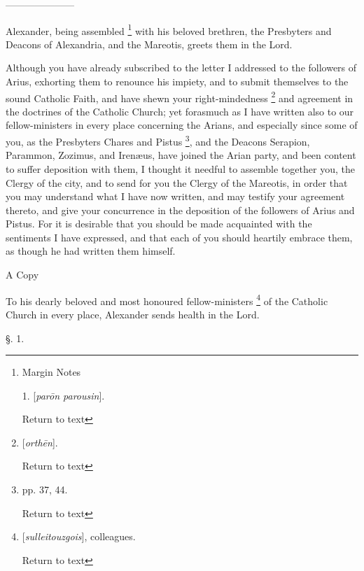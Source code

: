 ———————

Alexander, being assembled \footnote{Margin Notes

1. [\emph{par\={o}n parousin}].

Return to text} with his beloved brethren, the Presbyters and Deacons of
Alexandria, and the Mareotis, greets them in the Lord.

Although you have already subscribed to the
letter I addressed to the followers of Arius, exhorting them to
renounce his impiety, and to submit themselves to the sound Catholic
Faith, and have shewn your right-mindedness \footnote{[\emph{orth\={e}n}].

Return to text} and agreement in the doctrines of the Catholic Church; yet
forasmuch as I have written also to our fellow-ministers in every
place concerning the Arians, and especially since some of you, as the
Presbyters Chares and Pistus \footnote{pp. 37, 44.

Return to text},
and the Deacons Serapion, Parammon, Zozimus, and Irenæus, have
joined the Arian party, and been content to suffer deposition with
them, I thought it needful to assemble together you, the Clergy of the
city, and to send for you the Clergy of the Mareotis, in order that
you may understand what I have now written, and may testify your
agreement thereto, and give your concurrence in the deposition of the
followers of Arius and Pistus. For it is desirable that you should be
made acquainted with the sentiments I have expressed, and that each of
you should heartily embrace them, as though he had written them
himself.

A Copy

To his dearly beloved and most honoured
fellow-ministers \footnote{[\emph{sulleitouzgois}],
colleagues.

Return to text} of the
Catholic Church in every place, Alexander sends health in the Lord.

§. 1.


